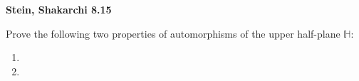 \textbf{Stein, Shakarchi 8.15}

Prove the following two properties of automorphisms of the upper half-plane $\mathbb{H}$:

\begin{enumerate}
  \item 
  \pagebreak
  \item 
\end{enumerate}
